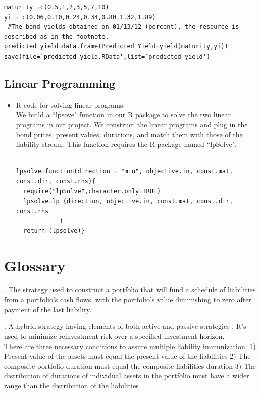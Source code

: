 \documentclass[oneside,12pt]{report}
\begin{document}
{\begin{itemize}
\begin{lstlisting}
maturity =c(0.5,1,2,3,5,7,10)
yi = c(0.06,0.10,0.24,0.34,0.80,1.32,1.89)
 #The bond yields obtained on 01/13/12 (percent), the resource is 
described as in the footnote.
predicted_yield=data.frame(Predicted_Yield=yield(maturity,yi))
save(file=`predicted_yield.RData',list=`predicted_yield')

\end{lstlisting}
\end{itemize}

\section{Linear Programming}
\begin{itemize}
\item R code for solving linear programs:\\
We build a ``lpsove" function in our R package to solve the two linear programs in our project. We construct the linear programs and plug in the bond prices, present values, durations, and match them with those of the liability stream. This function requires the R package named ``lpSolve".\\

\begin{lstlisting}
  
lpsolve=function(direction = "min", objective.in, const.mat, const.dir, const.rhs){
  require("lpSolve",character.only=TRUE)
  lpsolve=lp (direction, objective.in, const.mat, const.dir, const.rhs
            )
  return (lpsolve)}

\end{lstlisting}
\end{itemize}

\chapter{Glossary}\label{Glossary}

\vspace{12pt} 

\vspace{8pt}
. The strategy used to construct a portfolio that will fund a schedule of liabilities from a portfolio's cash flows, with the portfolio's value diminishing to zero after payment of the last liability. 

\vspace{8pt}
. A hybrid strategy having elements of both active and passive strategies . It's used to minimize reinvestment risk over a specified investment horizon.\\
There are three necessary conditions to assure multiple liability immunization:
1) Present value of the assets must equal the present value of the liabilities
2) The composite portfolio duration must equal the composite liabilities duration
3) The distribution of durations of individual assets in the portfolio must have a wider range than the distribution of the liabilities


}
\end{document}

